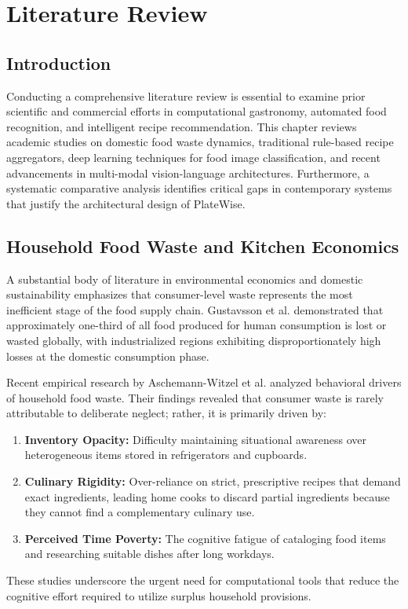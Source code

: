 \chapter{Literature Review}

\section{Introduction}
Conducting a comprehensive literature review is essential to examine prior scientific and commercial efforts in computational gastronomy, automated food recognition, and intelligent recipe recommendation. This chapter reviews academic studies on domestic food waste dynamics, traditional rule-based recipe aggregators, deep learning techniques for food image classification, and recent advancements in multi-modal vision-language architectures. Furthermore, a systematic comparative analysis identifies critical gaps in contemporary systems that justify the architectural design of PlateWise.

\section{Household Food Waste and Kitchen Economics}
A substantial body of literature in environmental economics and domestic sustainability emphasizes that consumer-level waste represents the most inefficient stage of the food supply chain. Gustavsson et al. \cite{gustavsson2011global} demonstrated that approximately one-third of all food produced for human consumption is lost or wasted globally, with industrialized regions exhibiting disproportionately high losses at the domestic consumption phase.

Recent empirical research by Aschemann-Witzel et al. \cite{aschemann2015causes} analyzed behavioral drivers of household food waste. Their findings revealed that consumer waste is rarely attributable to deliberate neglect; rather, it is primarily driven by:
\begin{enumerate}
    \item \textbf{Inventory Opacity:} Difficulty maintaining situational awareness over heterogeneous items stored in refrigerators and cupboards.
    \item \textbf{Culinary Rigidity:} Over-reliance on strict, prescriptive recipes that demand exact ingredients, leading home cooks to discard partial ingredients because they cannot find a complementary culinary use.
    \item \textbf{Perceived Time Poverty:} The cognitive fatigue of cataloging food items and researching suitable dishes after long workdays.
\end{enumerate}
These studies underscore the urgent need for computational tools that reduce the cognitive effort required to utilize surplus household provisions.

